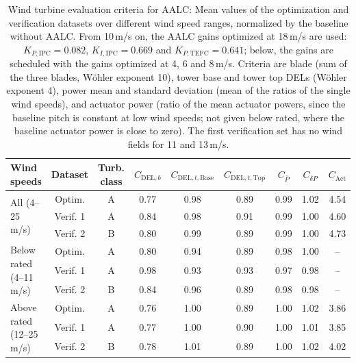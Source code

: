\begin{table}[h]
    \centering
    \caption[Wind turbine evaluation criteria for AALC: Mean values of the optimization and verification datasets over wind speed ranges]{\label{tabone} Wind turbine evaluation criteria for AALC: Mean values of the optimization and verification datasets over different wind speed ranges, normalized by the baseline without AALC. From 10\,m/s on, the AALC gains optimized at 18\,m/s are used: $K_{P,\text{IPC}} = 0.082$, $K_{I,\text{IPC}} = 0.669$ and $K_{P,\text{TEFC}} = 0.641$; below, the gains are scheduled with the gains optimized at 4, 6 and 8\,m/s. Criteria are blade (sum of the three blades, W\"ohler exponent 10), tower base and tower top DELs (W\"ohler exponent 4), power mean and standard deviation (mean of the ratios of the single wind speeds), and actuator power (ratio of the mean actuator powers, since the baseline pitch is constant at low wind speeds; not given below rated, where the baseline actuator power is close to zero). The first verification set has no wind fields for 11 and 13\,m/s.}
    \begin{tabular}{@{}l*{8}{c}@{}}
        \toprule
        Wind speeds & Dataset & Turb. class & $C_{\text{DEL},b}$ & $C_{\text{DEL},t,\text{Base}}$ & $C_{\text{DEL},t,\text{Top}}$ & $C_{\bar{P}}$ & $C_{\delta P}$ & $C_{\text{Act}}$ \\
        \midrule
        \multirow{3}{*}{All (4--25\,m/s)} & Optim. & A & 0.77 & 0.98 & 0.89 & 0.99 & 1.02 & 4.54 \\
         & Verif. 1 & A & 0.84 & 0.98 & 0.91 & 0.99 & 1.00 & 4.60 \\
         & Verif. 2 & B & 0.80 & 0.99 & 0.89 & 0.99 & 1.00 & 4.73 \\
        \midrule
        \multirow{3}{*}{Below rated (4--11\,m/s)} & Optim. & A & 0.80 & 0.94 & 0.89 & 0.98 & 1.00 & -- \\
         & Verif. 1 & A & 0.98 & 0.93 & 0.93 & 0.97 & 0.98 & -- \\
         & Verif. 2 & B & 0.84 & 0.96 & 0.89 & 0.98 & 0.98 & -- \\
        \midrule
        \multirow{3}{*}{Above rated (12--25\,m/s)} & Optim. & A & 0.76 & 1.00 & 0.89 & 1.00 & 1.02 & 3.86 \\
         & Verif. 1 & A & 0.77 & 1.00 & 0.90 & 1.00 & 1.01 & 3.85 \\
         & Verif. 2 & B & 0.78 & 1.01 & 0.89 & 1.00 & 1.02 & 4.02 \\
        \midrule

\end{tabular}
\end{table}
